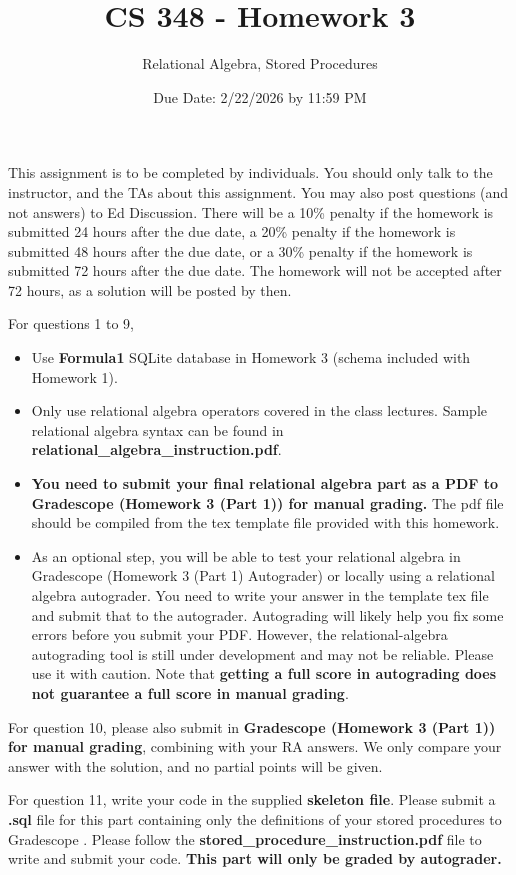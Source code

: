 \documentclass[12pt]{exam}
\title{CS 348 - Homework 3 }
\author{Relational Algebra, Stored Procedures}
\date{Due Date: 2/22/2026 by 11:59 PM}
\begin{document}
\maketitle
\noindent
This assignment is to be completed by individuals. You should only talk to the instructor, and the TAs about this assignment. You may also post questions (and not answers) to Ed Discussion. 
There will be a 10\% penalty if the homework is submitted 24 hours after the due date, a 20\% penalty if the homework is submitted 48 hours after the due date, or a 30\% penalty if the homework is submitted 72 hours after the due date. The homework will not be accepted after 72 hours, as a solution will be posted by then.

For questions 1 to 9, 
\begin{itemize}
    \item Use \textbf{Formula1} SQLite database in Homework 3 (schema included with Homework 1).
    \item Only use relational algebra operators covered in the class lectures. Sample relational algebra syntax can be found in \textbf{relational\_algebra\_instruction.pdf}.
    \item \textbf{You need to submit your final relational algebra part as a PDF to Gradescope (Homework 3 (Part 1)) for manual grading.} The pdf file should be compiled from the tex template file provided with this homework. 
    \item As an optional step, you will be able to test your relational algebra in Gradescope (Homework 3 (Part 1) Autograder) or locally using a relational algebra autograder. You need to write your answer in the template tex file and submit that to the autograder. Autograding will likely help you fix some errors before you submit your PDF. However, the relational-algebra autograding tool is still under development and may not be reliable. Please use it with caution. Note that \textbf{getting a full score in autograding does not guarantee a full score in manual grading}.
\end{itemize}

For question 10, please also submit in \textbf{Gradescope (Homework 3 (Part 1)) for manual grading}, combining with your RA answers. We only compare your answer with the solution, and no partial points will be given.

For question 11, write your code in the supplied \textbf{skeleton file}. Please submit a \textbf{.sql} file for this part containing only the definitions of your stored procedures to Gradescope . Please follow the \textbf{stored\_procedure\_instruction.pdf} file to write and submit your code. \textbf{This part will only be graded by autograder.}\\ 
\end{document}
